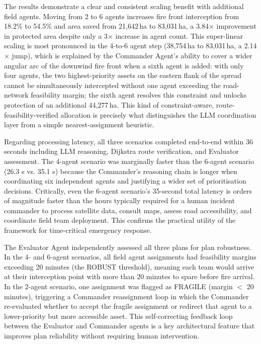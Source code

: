 \documentclass[12pt,a4paper]{article}
\begin{document}
The results demonstrate a clear and consistent scaling benefit with additional field agents. Moving from 2 to 6 agents increases fire front interception from 18.2\% to 54.5\% and area saved from 21,642\,ha to 83,031\,ha, a 3.84$\times$ improvement in protected area despite only a 3$\times$ increase in agent count. This super-linear scaling is most pronounced in the 4-to-6 agent step (38,754\,ha to 83,031\,ha, a 2.14$\times$ jump), which is explained by the Commander Agent's ability to cover a wider angular arc of the downwind fire front when a sixth agent is added: with only four agents, the two highest-priority assets on the eastern flank of the spread cannot be simultaneously intercepted without one agent exceeding the road-network feasibility margin; the sixth agent resolves this constraint and unlocks protection of an additional 44,277\,ha. This kind of constraint-aware, route-feasibility-verified allocation is precisely what distinguishes the LLM coordination layer from a simple nearest-assignment heuristic.

Regarding processing latency, all three scenarios completed end-to-end within 36 seconds including LLM reasoning, Dijkstra route verification, and Evaluator assessment. The 4-agent scenario was marginally faster than the 6-agent scenario (26.3 s vs. 35.1 s) because the Commander's reasoning chain is longer when coordinating six independent agents and justifying a wider set of prioritisation decisions. Critically, even the 6-agent scenario's 35-second total latency is orders of magnitude faster than the hours typically required for a human incident commander to process satellite data, consult maps, assess road accessibility, and coordinate field team deployment. This confirms the practical utility of the framework for time-critical emergency response.

The Evaluator Agent independently assessed all three plans for plan robustness. In the 4- and 6-agent scenarios, all field agent assignments had feasibility margins exceeding 20 minutes (the ROBUST threshold), meaning each team would arrive at their interception point with more than 20 minutes to spare before fire arrival. In the 2-agent scenario, one assignment was flagged as FRAGILE (margin $<$ 20 minutes), triggering a Commander reassignment loop in which the Commander re-evaluated whether to accept the fragile assignment or redirect that agent to a lower-priority but more accessible asset. This self-correcting feedback loop between the Evaluator and Commander agents is a key architectural feature that improves plan reliability without requiring human intervention.
\end{document}
